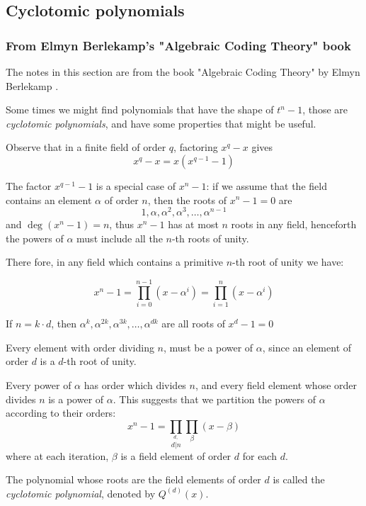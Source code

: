 \documentclass{article}
\theoremstyle{definition}
\newenvironment{thm}[1]
{\renewcommand\theinnerthm{#1}\innerthm}
{\endinnerthm}
\begin{document}
\subsection{Cyclotomic polynomials} \label{cyclotomicpoly}
\subsubsection{From Elmyn Berlekamp's "Algebraic Coding Theory" book}
The notes in this section are from the book "Algebraic Coding Theory" by Elmyn
Berlekamp \cite{berlekamp}.

\vspace{0.3cm}

Some times we might find polynomials that have the shape of $t^n - 1$, those are \emph{cyclotomic polynomials}, and have some properties that might be useful.

Observe that in a finite field of order $q$, factoring $x^q - x$ gives
$$x^q-x = x(x^{q-1} -1)$$

The factor $x^{q-1} -1$ is a special case of $x^n -1$: if we assume that the
field contains an element $\alpha$ of order $n$, then the roots of $x^n-1=0$ are
$$1, \alpha, \alpha^2, \alpha^3, \ldots, \alpha^{n-1}$$
and $\deg(x^n-1)=n$, thus $x^n-1$ has at most $n$ roots in any field, henceforth
the powers of $\alpha$ must include all the $n$-th roots of unity.

There fore, in any field which contains a primitive $n$-th root of unity we have:

\begin{thm}{4.31}
  $$x^n -1 = \prod_{i=0}^{n-1} (x - \alpha^i) = \prod_{i=1}^n (x-\alpha^i)$$
\end{thm}

If $n=k \cdot d$, then $\alpha^k, \alpha^{2k}, \alpha^{3k}, \ldots, \alpha^{dk}$ are all roots of $x^d -1 =0$

Every element with order dividing $n$, must be a power of $\alpha$, since an
element of order $d$ is a $d$-th root of unity.

Every power of $\alpha$ has order which divides $n$, and every field element
whose order divides $n$ is a power of $\alpha$. This suggests that we partition
the powers of $\alpha$ according to their orders:
$$x^n -1 = \prod_{\stackrel{d,}{d|n}} \prod_{\beta} (x- \beta)$$
where at each iteration, $\beta$ is a field element of order $d$ for each $d$.

The polynomial whose roots are the field elements of order $d$ is called the
\emph{cyclotomic polynomial}, denoted by $Q^{(d)}(x)$.
\end{document}

